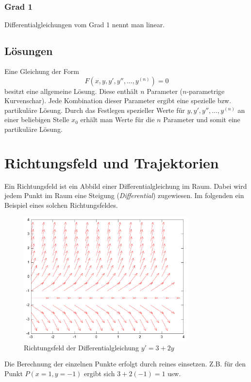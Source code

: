 \subsubsection{Grad 1}
Differentialgleichungen vom Grad 1 nennt man linear. 

\subsection{Lösungen}
Eine Gleichung der Form
\[ F(x, y, y', y'', \ldots, y^{(n)})=0 \]
besitzt eine allgemeine Lösung. Diese enthält $n$ Parameter ($n$-parametrige 
Kurvenschar). Jede Kombination dieser Parameter ergibt eine spezielle bzw. 
partikuläre Lösung. Durch das Festlegen spezieller Werte für 
$y, y', y'', \ldots, y^{(n)}$ an einer beliebigen Stelle $x_0$ erhält man Werte 
für die $n$ Parameter und somit eine partikuläre Lösung. 

\section{Richtungsfeld und Trajektorien}
Ein Richtungsfeld ist ein Abbild einer Differentialgleichung im Raum.
Dabei wird jedem Punkt im Raum eine Steigung (\emph{Differential})
zugewiesen. Im folgenden ein Beispiel eines solchen Richtungsfeldes.

\begin{figure}[h!]
	\centering
	\includegraphics[width=0.8\textwidth]{field.pdf}
	\caption{Richtungsfeld der Differentialgleichung $y'=3+2y$}
\end{figure}

\noindent
Die Berechnung der einzelnen Punkte erfolgt durch reines einsetzen.
Z.B. für den Punkt $P(x=1, y=-1)$ ergibt sich $3+2(-1)=1$ usw.

